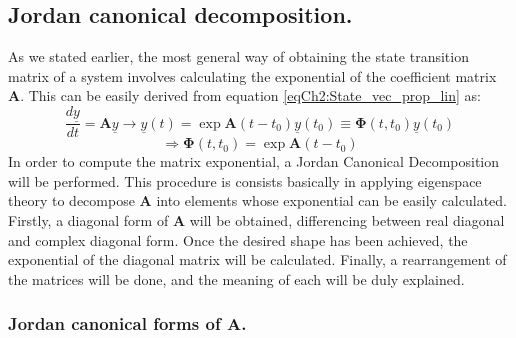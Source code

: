 	\subsection{Jordan canonical decomposition.}
	\indent As we stated earlier, the most general way of obtaining the state transition matrix of a system involves calculating the exponential of the coefficient matrix $\bm A$. This can be easily derived from equation \eqref{eqCh2:State_vec_prop_lin} as:
	\[ 
	\dfrac{d\underline{y}}{dt} = \bm A \underline{y} \rightarrow \underline{y}(t) = \exp \bm A(t -t_0) \underline{y}(t_0) \equiv \bm \Phi (t, t_0) \underline{y}(t_0) 
	\]
	\begin{equation}
	\Rightarrow \bm \Phi (t, t_0) = \exp \bm A(t -t_0)
	\end{equation}
	\indent In order to compute the matrix exponential, a Jordan Canonical Decomposition will be performed. This procedure is consists basically in applying eigenspace theory to decompose $\bm A$ into elements whose exponential can be easily calculated. Firstly, a diagonal form of $\bm A$ will be obtained, differencing between real diagonal and complex diagonal form. Once the desired shape has been achieved, the exponential of the diagonal matrix will be calculated. Finally, a rearrangement of the matrices will be done, and the meaning of each will be duly explained.
		\subsubsection{Jordan canonical forms of $\bm A$.}
